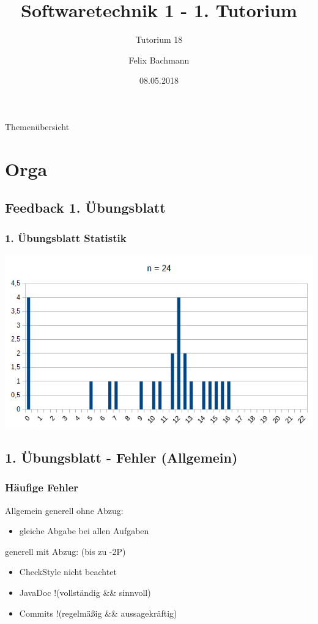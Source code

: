 \documentclass[18pt]{beamer}
\title[SWT1]{Softwaretechnik 1 - 1. Tutorium}
\subtitle{Tutorium 18}
\author{Felix Bachmann}
\date{08.05.2018}
\institute{KIT - Institut für Programmstrukturen und Datenorganisation (IPD)}
\begin{document}

\begin{frame}
\titlepage
\end{frame}

\begin{frame}{Themenübersicht}
\tableofcontents
\end{frame}

\section{Orga}
	\subsection{Feedback 1. Übungsblatt}
	\begin{frame}
		\frametitle{1. Übungsblatt Statistik}
		\includegraphics[scale=0.7]{./pics/tut1/statistics_ub1.png}
	\end{frame}
	
	\subsection{1. Übungsblatt - Fehler (Allgemein)}
	\begin{frame}
		\frametitle{Häufige Fehler}
		\begin{block}{Allgemein}
			generell ohne Abzug:
			\begin{itemize}
				\item gleiche Abgabe bei allen Aufgaben
			\end{itemize}
			\pause
			generell mit Abzug: (bis zu -2P)
			\begin{itemize}
				\item  CheckStyle nicht beachtet
				\item JavaDoc !(vollständig \&\& sinnvoll)
				\item Commits !(regelmäßig \&\& aussagekräftig)
			\end{itemize}
		\end{block}
	\end{frame}
	
\end{document}
